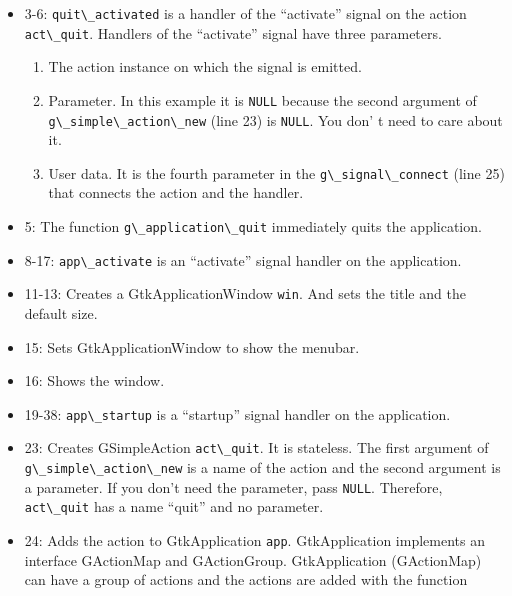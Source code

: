 \begin{itemize}
\tightlist
\item
  3-6: \passthrough{\lstinline!quit\_activated!} is a handler of the
  ``activate'' signal on the action \passthrough{\lstinline!act\_quit!}.
  Handlers of the ``activate'' signal have three parameters.

  \begin{enumerate}
  \def\labelenumi{\arabic{enumi}.}
  \tightlist
  \item
    The action instance on which the signal is emitted.
  \item
    Parameter. In this example it is \passthrough{\lstinline!NULL!}
    because the second argument of
    \passthrough{\lstinline!g\_simple\_action\_new!} (line 23) is
    \passthrough{\lstinline!NULL!}. You don' t need to care about it.
  \item
    User data. It is the fourth parameter in the
    \passthrough{\lstinline!g\_signal\_connect!} (line 25) that connects
    the action and the handler.
  \end{enumerate}
\item
  5: The function \passthrough{\lstinline!g\_application\_quit!}
  immediately quits the application.
\item
  8-17: \passthrough{\lstinline!app\_activate!} is an ``activate''
  signal handler on the application.
\item
  11-13: Creates a GtkApplicationWindow \passthrough{\lstinline!win!}.
  And sets the title and the default size.
\item
  15: Sets GtkApplicationWindow to show the menubar.
\item
  16: Shows the window.
\item
  19-38: \passthrough{\lstinline!app\_startup!} is a ``startup'' signal
  handler on the application.
\item
  23: Creates GSimpleAction \passthrough{\lstinline!act\_quit!}. It is
  stateless. The first argument of
  \passthrough{\lstinline!g\_simple\_action\_new!} is a name of the
  action and the second argument is a parameter. If you don't need the
  parameter, pass \passthrough{\lstinline!NULL!}. Therefore,
  \passthrough{\lstinline!act\_quit!} has a name ``quit'' and no
  parameter.
\item
  24: Adds the action to GtkApplication \passthrough{\lstinline!app!}.
  GtkApplication implements an interface GActionMap and GActionGroup.
  GtkApplication (GActionMap) can have a group of actions and the
  actions are added with the function

\end{itemize}
